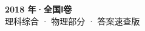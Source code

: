 \documentclass[zihao=-4, a4paper]{ctexart}
\begin{document}
\begin{center}
  {\Large\bfseries 2018 年·全国Ⅰ卷}\\[4pt]
  {\large 理科综合 · 物理部分 · 答案速查版}
\end{center}
\medskip
{}

\clearpage
{}

\end{document}
